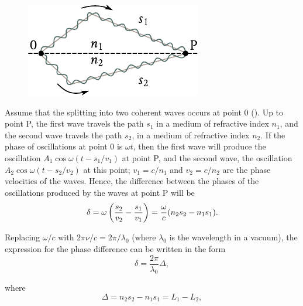 \begin{figure}[t]
	\begin{center}
		\includegraphics[scale=1]{figures/ch_17/fig_17_1.pdf}
		\caption[]{}
		\label{fig:17_1}
	\end{center}
	\vspace{-0.8cm}
\end{figure}

Assume that the splitting into two coherent waves occurs at point $0$ ().
Up to point P, the first wave travels the path $s_1$ in a medium of refractive index $n_1$, and the second wave travels the path $s_2$, in a medium of refractive index $n_2$.
If the phase of oscillations at point $0$ is $\omega t$, then the first wave will produce the oscillation $A_1\cos\omega(t-s_1/v_1)$ at point P, and the second wave, the oscillation $A_2\cos\omega(t-s_2/v_2)$ at this point; $v_1=c/n_1$ and $v_2=c/n_2$ are the phase velocities of the waves.
Hence, the difference between the phases of the oscillations produced by the waves at point P will be
\begin{equation*}
    \delta = \omega \left(\frac{s_2}{v_2} - \frac{s_1}{v_1}\right) = \frac{\omega}{c} (n_2 s_2 - n_1 s_1).
\end{equation*}

\noindent
Replacing $\omega/c$ with $2\pi\nu/c = 2\pi/\lambda_0$ (where $\lambda_0$ is the wavelength in
a vacuum), the expression for the phase difference can be written in the form
\begin{equation}\label{eq:17_3}
    \delta = \frac{2 \pi}{\lambda_0} \Delta,
\end{equation}

\noindent
where
\begin{equation}\label{eq:17_4}
    \Delta = n_2 s_2 - n_1 s_1 = L_1 - L_2,
\end{equation}

